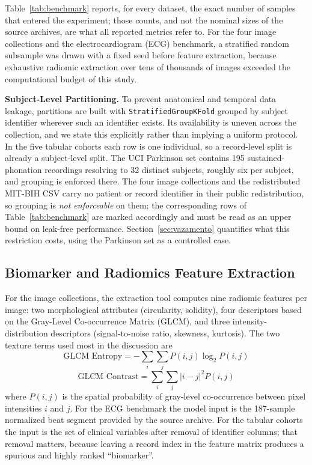 \documentclass[conference]{IEEEtran}
\begin{document}
Table~\ref{tab:benchmark} reports, for every dataset, the exact number of samples that entered the experiment; those counts, and not the nominal sizes of the source archives, are what all reported metrics refer to. For the four image collections and the electrocardiogram (ECG) benchmark, a stratified random subsample was drawn with a fixed seed before feature extraction, because exhaustive radiomic extraction over tens of thousands of images exceeded the computational budget of this study.

\textbf{Subject-Level Partitioning.} To prevent anatomical and temporal data leakage, partitions are built with \texttt{StratifiedGroupKFold} grouped by subject identifier wherever such an identifier exists. Its availability is uneven across the collection, and we state this explicitly rather than implying a uniform protocol. In the five tabular cohorts each row is one individual, so a record-level split is already a subject-level split. The UCI Parkinson set contains 195 sustained-phonation recordings resolving to 32 distinct subjects, roughly six per subject, and grouping is enforced there. The four image collections and the redistributed MIT-BIH CSV carry no patient or record identifier in their public redistribution, so grouping is \emph{not enforceable} on them; the corresponding rows of Table~\ref{tab:benchmark} are marked accordingly and must be read as an upper bound on leak-free performance. Section~\ref{sec:vazamento} quantifies what this restriction costs, using the Parkinson set as a controlled case.

\subsection{Biomarker and Radiomics Feature Extraction}
For the image collections, the extraction tool computes nine radiomic features per image: two morphological attributes (circularity, solidity), four descriptors based on the Gray-Level Co-occurrence Matrix (GLCM), and three intensity-distribution descriptors (signal-to-noise ratio, skewness, kurtosis). The two texture terms used most in the discussion are
\begin{equation}
\text{GLCM Entropy} = -\sum_{i}\sum_{j} P(i,j) \log_2 P(i,j)
\end{equation}
\begin{equation}
\text{GLCM Contrast} = \sum_{i}\sum_{j} |i - j|^2 P(i,j)
\end{equation}
where $P(i,j)$ is the spatial probability of gray-level co-occurrence between pixel intensities $i$ and $j$. For the ECG benchmark the model input is the 187-sample normalized beat segment provided by the source archive. For the tabular cohorts the input is the set of clinical variables after removal of identifier columns; that removal matters, because leaving a record index in the feature matrix produces a spurious and highly ranked ``biomarker''.
\end{document}
